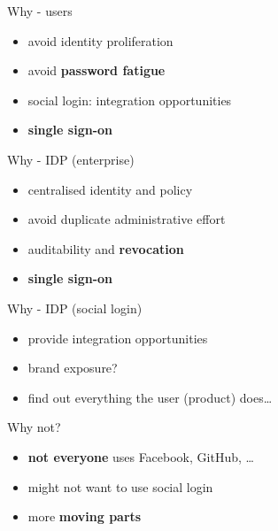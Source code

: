 \documentclass[ignorenonframetext,aspectratio=169]{beamer}
\providecommand{\tightlist}{%
  \setlength{\itemsep}{0pt}\setlength{\parskip}{0pt}}
\begin{document}
\begin{frame}{Why - users}

\begin{itemize}
\tightlist
\item avoid identity proliferation
\item avoid {\bf password fatigue}
\item social login: integration opportunities
\item \bf single sign-on
\end{itemize}

\end{frame}

\begin{frame}{Why - IDP (enterprise)}

\begin{itemize}
\tightlist
\item centralised identity and policy
\item avoid duplicate administrative effort
\item auditability and {\bf revocation}
\item \bf single sign-on
\end{itemize}

\end{frame}

\begin{frame}{Why - IDP (social login)}
\begin{itemize}
\tightlist
\item provide integration opportunities
\item brand exposure?
\item find out everything the user (product) does\ldots
\end{itemize}
\end{frame}

\begin{frame}{Why not?}
\begin{itemize}
\tightlist
\item {\bf not everyone} uses Facebook, GitHub, \ldots
\item might not want to use social login
\item more {\bf moving parts}
\end{itemize}
\end{frame}
\end{document}
